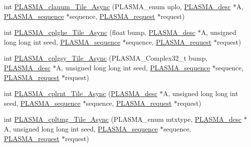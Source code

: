 \begin{DoxyCompactItemize}
\item 
int \hyperlink{group__PLASMA__Complex32__t__Tile__Async_ga73b7ac4d78fb5599919587fa3bbd20c5_ga73b7ac4d78fb5599919587fa3bbd20c5}{P\+L\+A\+S\+M\+A\+\_\+clauum\+\_\+\+Tile\+\_\+\+Async} (P\+L\+A\+S\+M\+A\+\_\+enum uplo, \hyperlink{structplasma__desc__t}{P\+L\+A\+S\+M\+A\+\_\+desc} $\ast$A, \hyperlink{structplasma__sequence__t}{P\+L\+A\+S\+M\+A\+\_\+sequence} $\ast$sequence, \hyperlink{structplasma__request__t}{P\+L\+A\+S\+M\+A\+\_\+request} $\ast$request)
\item 
int \hyperlink{group__PLASMA__Complex32__t__Tile__Async_gab957768cccc691601cd0346821e5c7d4_gab957768cccc691601cd0346821e5c7d4}{P\+L\+A\+S\+M\+A\+\_\+cplghe\+\_\+\+Tile\+\_\+\+Async} (float bump, \hyperlink{structplasma__desc__t}{P\+L\+A\+S\+M\+A\+\_\+desc} $\ast$A, unsigned long long int seed, \hyperlink{structplasma__sequence__t}{P\+L\+A\+S\+M\+A\+\_\+sequence} $\ast$sequence, \hyperlink{structplasma__request__t}{P\+L\+A\+S\+M\+A\+\_\+request} $\ast$request)
\item 
int \hyperlink{group__PLASMA__Complex32__t__Tile__Async_ga61e354c36bb84bcdc1242c608e78cc83_ga61e354c36bb84bcdc1242c608e78cc83}{P\+L\+A\+S\+M\+A\+\_\+cplgsy\+\_\+\+Tile\+\_\+\+Async} (P\+L\+A\+S\+M\+A\+\_\+\+Complex32\+\_\+t bump, \hyperlink{structplasma__desc__t}{P\+L\+A\+S\+M\+A\+\_\+desc} $\ast$A, unsigned long long int seed, \hyperlink{structplasma__sequence__t}{P\+L\+A\+S\+M\+A\+\_\+sequence} $\ast$sequence, \hyperlink{structplasma__request__t}{P\+L\+A\+S\+M\+A\+\_\+request} $\ast$request)
\item 
int \hyperlink{group__PLASMA__Complex32__t__Tile__Async_gaa88bc1e1488c6aa0b7c47b3140641caf_gaa88bc1e1488c6aa0b7c47b3140641caf}{P\+L\+A\+S\+M\+A\+\_\+cplrnt\+\_\+\+Tile\+\_\+\+Async} (\hyperlink{structplasma__desc__t}{P\+L\+A\+S\+M\+A\+\_\+desc} $\ast$A, unsigned long long int seed, \hyperlink{structplasma__sequence__t}{P\+L\+A\+S\+M\+A\+\_\+sequence} $\ast$sequence, \hyperlink{structplasma__request__t}{P\+L\+A\+S\+M\+A\+\_\+request} $\ast$request)
\item 
int \hyperlink{group__PLASMA__Complex32__t__Tile__Async_ga7bc056fedab4e8b96a6e210c05e8552f_ga7bc056fedab4e8b96a6e210c05e8552f}{P\+L\+A\+S\+M\+A\+\_\+cpltmg\+\_\+\+Tile\+\_\+\+Async} (P\+L\+A\+S\+M\+A\+\_\+enum mtxtype, \hyperlink{structplasma__desc__t}{P\+L\+A\+S\+M\+A\+\_\+desc} $\ast$A, unsigned long long int seed, \hyperlink{structplasma__sequence__t}{P\+L\+A\+S\+M\+A\+\_\+sequence} $\ast$sequence, \hyperlink{structplasma__request__t}{P\+L\+A\+S\+M\+A\+\_\+request} $\ast$request)
\item 

\end{DoxyCompactItemize}
